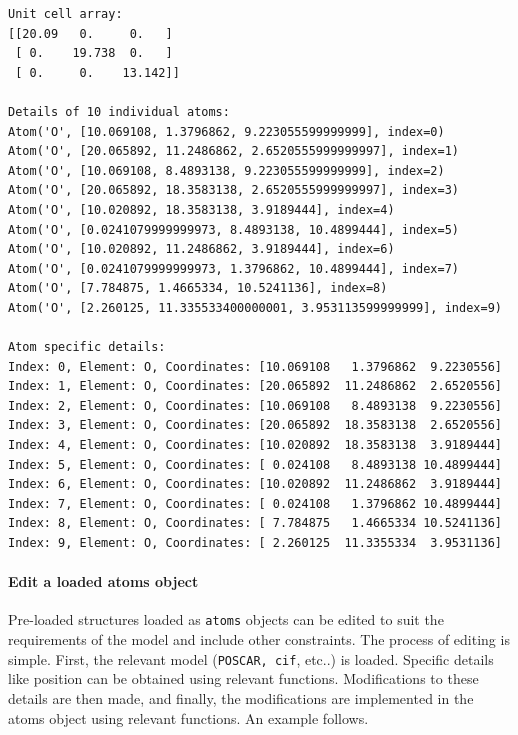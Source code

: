 \documentclass[11pt]{article}
\begin{document}
    \begin{Verbatim}[commandchars=\\\{\}]
Unit cell array:
[[20.09   0.     0.   ]
 [ 0.    19.738  0.   ]
 [ 0.     0.    13.142]] 

Details of 10 individual atoms: 
Atom('O', [10.069108, 1.3796862, 9.223055599999999], index=0)
Atom('O', [20.065892, 11.2486862, 2.6520555999999997], index=1)
Atom('O', [10.069108, 8.4893138, 9.223055599999999], index=2)
Atom('O', [20.065892, 18.3583138, 2.6520555999999997], index=3)
Atom('O', [10.020892, 18.3583138, 3.9189444], index=4)
Atom('O', [0.0241079999999973, 8.4893138, 10.4899444], index=5)
Atom('O', [10.020892, 11.2486862, 3.9189444], index=6)
Atom('O', [0.0241079999999973, 1.3796862, 10.4899444], index=7)
Atom('O', [7.784875, 1.4665334, 10.5241136], index=8)
Atom('O', [2.260125, 11.335533400000001, 3.953113599999999], index=9)

Atom specific details: 
Index: 0, Element: O, Coordinates: [10.069108   1.3796862  9.2230556]
Index: 1, Element: O, Coordinates: [20.065892  11.2486862  2.6520556]
Index: 2, Element: O, Coordinates: [10.069108   8.4893138  9.2230556]
Index: 3, Element: O, Coordinates: [20.065892  18.3583138  2.6520556]
Index: 4, Element: O, Coordinates: [10.020892  18.3583138  3.9189444]
Index: 5, Element: O, Coordinates: [ 0.024108   8.4893138 10.4899444]
Index: 6, Element: O, Coordinates: [10.020892  11.2486862  3.9189444]
Index: 7, Element: O, Coordinates: [ 0.024108   1.3796862 10.4899444]
Index: 8, Element: O, Coordinates: [ 7.784875   1.4665334 10.5241136]
Index: 9, Element: O, Coordinates: [ 2.260125  11.3355334  3.9531136]

    \end{Verbatim}

    \paragraph{Edit a loaded atoms object}\label{edit-a-loaded-atoms-object}

Pre-loaded structures loaded as \texttt{atoms} objects can be edited to
suit the requirements of the model and include other constraints. The
process of editing is simple. First, the relevant model
(\texttt{POSCAR,\ cif}, etc..) is loaded. Specific details like position
can be obtained using relevant functions. Modifications to these details
are then made, and finally, the modifications are implemented in the
atoms object using relevant functions. An example follows.
\end{document}
